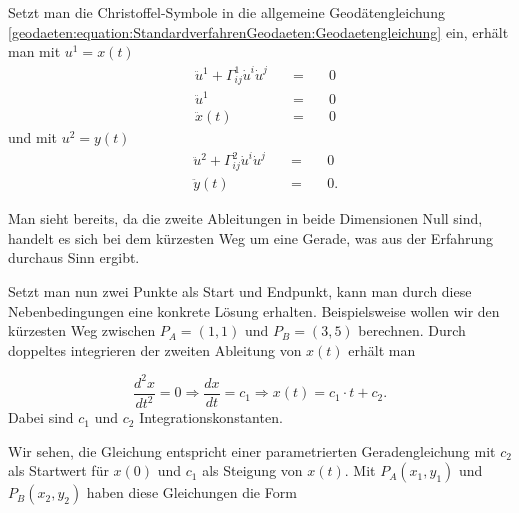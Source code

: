 Setzt man die Christoffel-Symbole in die allgemeine Geodätengleichung \eqref{geodaeten:equation:StandardverfahrenGeodaeten:Geodaetengleichung} ein, erhält man mit $u^1 = x(t)$
\begin{equation}
	\begin{alignedat}{3}
		&\ddot{u}^1 + \Gamma_{ij}^1 \dot{u}^i \dot{u}^j &\quad = \quad& 0 \\
		&\ddot{u}^1  &\quad = \quad& 0 \\
		&\ddot{x}(t) &\quad = \quad& 0
	\end{alignedat}
	\label{geodaeten:equation:Standardverfahren:Kartesisch:x}
\end{equation}
und mit $u^2 = y(t)$
\begin{equation}
	\begin{alignedat}{3}
		&\ddot{u}^2 + \Gamma_{ij}^2 \dot{u}^i \dot{u}^j &\quad = \quad& 0 \\
		&\ddot{y}(t) &\quad = \quad& 0  .
	\end{alignedat}
	\label{geodaeten:equation:Standardverfahren:Kartesisch:y}
\end{equation}



Man sieht bereits, da die zweite Ableitungen in beide Dimensionen Null sind, handelt es sich bei dem kürzesten Weg um eine Gerade, was aus der Erfahrung durchaus Sinn ergibt.

Setzt man nun zwei Punkte als Start und Endpunkt, kann man durch diese Nebenbedingungen eine konkrete Lösung erhalten.
Beispielsweise wollen wir den kürzesten Weg zwischen $P_A = (1,1)$ und $P_B = (3,5)$ berechnen. 
Durch doppeltes integrieren der zweiten Ableitung von $x(t)$ erhält man

\begin{equation}
	\frac{d^2x}{dt^2} = 0 
	\Rightarrow \frac{dx}{dt} = c_1 
	\Rightarrow x(t) = c_1 \cdot t + c_2  .
	\label{geodaeten:equation:Standardverfahren:Kartesisch:equation1}
\end{equation}
Dabei sind $c_1$  und $c_2$ Integrationskonstanten. 

Wir sehen, die Gleichung entspricht einer parametrierten Geradengleichung mit $c_2$ als Startwert für $x(0)$ und $c_1$ als Steigung von $x(t)$. 
Mit $P_A(x_1,y_1)$ und $P_B(x_2,y_2)$ haben diese Gleichungen die Form

